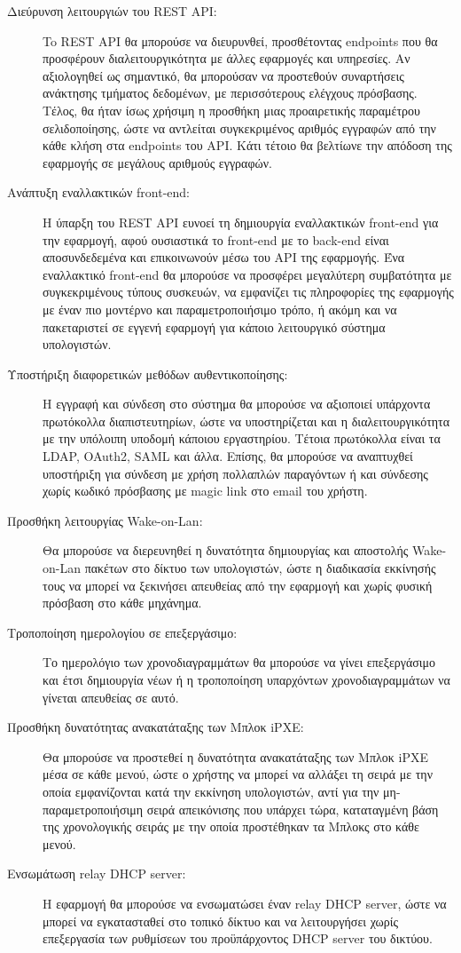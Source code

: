 \begin{description}
	\item[Διεύρυνση λειτουργιών του REST API:] To REST API θα μπορούσε να διευρυνθεί, προσθέτοντας endpoints που θα προσφέρουν διαλειτουργικότητα με άλλες εφαρμογές και υπηρεσίες. Αν αξιολογηθεί ως σημαντικό, θα μπορούσαν να προστεθούν συναρτήσεις ανάκτησης τμήματος δεδομένων, με περισσότερους ελέγχους πρόσβασης. Τέλος, θα ήταν ίσως χρήσιμη η προσθήκη μιας προαιρετικής παραμέτρου σελιδοποίησης, ώστε να αντλείται συγκεκριμένος αριθμός εγγραφών από την κάθε κλήση στα endpoints του API. Κάτι τέτοιο θα βελτίωνε την απόδοση της εφαρμογής σε μεγάλους αριθμούς εγγραφών.
	\item[Ανάπτυξη εναλλακτικών front-end:] Η ύπαρξη του REST API ευνοεί τη δημιουργία εναλλακτικών front-end για την εφαρμογή, αφού ουσιαστικά το front-end με το back-end είναι αποσυνδεδεμένα και επικοινωνούν μέσω του API της εφαρμογής. Ένα εναλλακτικό front-end θα μπορούσε να προσφέρει μεγαλύτερη συμβατότητα με συγκεκριμένους τύπους συσκευών, να εμφανίζει τις πληροφορίες της εφαρμογής με έναν πιο μοντέρνο και παραμετροποιήσιμο τρόπο, ή ακόμη και να πακεταριστεί σε εγγενή εφαρμογή για κάποιο λειτουργικό σύστημα υπολογιστών.
	\item[Υποστήριξη διαφορετικών μεθόδων αυθεντικοποίησης:] Η εγγραφή και σύνδεση στο σύστημα θα μπορούσε να αξιοποιεί υπάρχοντα πρωτόκολλα διαπιστευτηρίων, ώστε να υποστηρίζεται και η διαλειτουργικότητα με την υπόλοιπη υποδομή κάποιου εργαστηρίου. Τέτοια πρωτόκολλα είναι τα LDAP, OAuth2, SAML και άλλα. Επίσης, θα μπορούσε να αναπτυχθεί υποστήριξη για σύνδεση με χρήση πολλαπλών παραγόντων ή και σύνδεσης χωρίς κωδικό πρόσβασης με magic link στο email του χρήστη.
	\item[Προσθήκη λειτουργίας Wake-on-Lan:] Θα μπορούσε να διερευνηθεί η δυνατότητα δημιουργίας και αποστολής Wake-on-Lan πακέτων στο δίκτυο των υπολογιστών, ώστε η διαδικασία εκκίνησής τους να μπορεί να ξεκινήσει απευθείας από την εφαρμογή και χωρίς φυσική πρόσβαση στο κάθε μηχάνημα.
	\item[Τροποποίηση ημερολογίου σε επεξεργάσιμο:] Το ημερολόγιο των χρονοδιαγραμμάτων θα μπορούσε να γίνει επεξεργάσιμο και έτσι δημιουργία νέων  ή η τροποποίηση υπαρχόντων χρονοδιαγραμμάτων να γίνεται απευθείας σε αυτό.
	\item[Προσθήκη δυνατότητας ανακατάταξης των Μπλοκ iPXE:] Θα μπορούσε να προστεθεί η δυνατότητα ανακατάταξης των Μπλοκ iPXE μέσα σε κάθε μενού, ώστε ο χρήστης να μπορεί να αλλάξει τη σειρά με την οποία εμφανίζονται κατά την εκκίνηση υπολογιστών, αντί για την μη-παραμετροποιήσιμη σειρά απεικόνισης που υπάρχει τώρα, καταταγμένη βάση της χρονολογικής σειράς με την οποία προστέθηκαν τα Μπλοκς στο κάθε μενού.
	\item[Ενσωμάτωση relay DHCP server:] Η εφαρμογή θα μπορούσε να ενσωματώσει έναν relay DHCP server, ώστε να μπορεί να εγκατασταθεί στο τοπικό δίκτυο και να λειτουργήσει χωρίς επεξεργασία των ρυθμίσεων του προϋπάρχοντος DHCP server του δικτύου.
\end{description}

